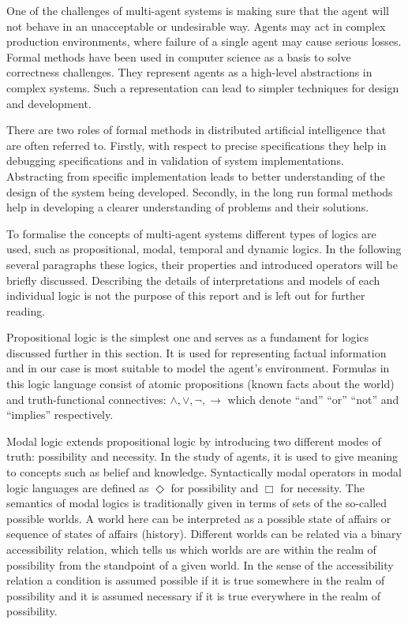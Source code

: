 One of the challenges of multi-agent systems is making sure that the agent will not behave in an unacceptable or undesirable way.
Agents may act in complex production environments, where failure of a single agent may cause serious losses.
Formal methods have been used in computer science as a basis to solve correctness challenges.
They represent agents as a high-level abstractions in complex systems.
Such a representation can lead to simpler techniques for design and development.

There are two roles of formal methods in distributed artificial intelligence that are often referred to.
Firstly, with respect to precise specifications they help in debugging specifications and in validation of system implementations.
Abstracting from specific implementation leads to better understanding of the design of the system being developed.
Secondly, in the long run formal methods help in developing a clearer understanding of problems and their solutions. \cite{Singh_99}

To formalise the concepts of multi-agent systems different types of logics are used, such as propositional, modal, temporal and dynamic logics. In the following several paragraphs these logics, their properties and introduced operators will be briefly discussed. Describing the details of interpretations and models of each individual logic is not the purpose of this report and is left out for further reading.

Propositional logic is the simplest one and serves as a fundament for logics discussed further in this section. It is used for representing factual information and in our case is most suitable to model the agent's environment. Formulas in this logic language consist of atomic propositions (known facts about the world) and truth-functional connectives: $\land,\lor,\neg,\rightarrow$ which denote ``and'' ``or'' ``not'' and ``implies'' respectively. \cite{Enderton_72}

Modal logic extends propositional logic by introducing two different modes of truth: possibility and necessity. In the study of agents, it is used to give
meaning to concepts such as belief and knowledge. Syntactically modal operators in modal logic languages are defined as $\Diamond$  for possibility and
$\Box$ for necessity. The semantics of modal logics is traditionally given in terms of sets of the so-called possible worlds. A world here can be interpreted as a possible state of affairs or sequence of states of affairs (history). Different worlds can be related via a binary accessibility relation, which tells us which worlds are are within the realm of possibility from the standpoint of a given world. In the sense of the accessibility relation a condition is assumed possible if it is true somewhere in the realm of possibility and it is assumed necessary if it is true everywhere in the realm of possibility. \cite{Saul_63}

